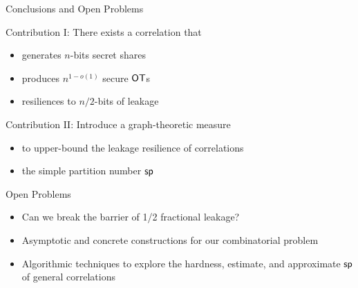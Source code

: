 \begin{frame}{Conclusions and Open Problems}

	{
		\begin{block} {Contribution I: There exists a correlation that}
			\begin{itemize}
				\item generates $ n $-bits secret shares
				\item  produces $ n^{1-o(1)} $ secure $\OT$s
				\item resiliences to $ n/2 $-bits of leakage 
			\end{itemize}
		\end{block}
		
		\pause
		
		\begin{block} {Contribution II: Introduce a graph-theoretic measure}
			\begin{itemize}
				\item to upper-bound the leakage resilience of correlations
				\item the simple partition number $ \mathsf{sp} $ 
			\end{itemize}
		\end{block}
		
	}

	\pause

	{
	\begin{block}{Open Problems}
		\begin{itemize}
			\item Can we break the barrier of 1/2 fractional leakage?
			\item Asymptotic and concrete constructions for our combinatorial problem
			\item Algorithmic techniques to explore the hardness, estimate, and approximate $ \mathsf{sp} $ of general correlations
		\end{itemize}		
	\end{block}
	}
\end{frame}